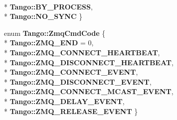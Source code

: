 \begin{DoxyCompactItemize}
\\*
{\bf Tango\-::\-B\-Y\-\_\-\-P\-R\-O\-C\-E\-S\-S}, 
\\*
{\bf Tango\-::\-N\-O\-\_\-\-S\-Y\-N\-C}
 \}
\item 
enum {\bf Tango\-::\-Zmq\-Cmd\-Code} \{ \\*
{\bf Tango\-::\-Z\-M\-Q\-\_\-\-E\-N\-D} = 0, 
\\*
{\bf Tango\-::\-Z\-M\-Q\-\_\-\-C\-O\-N\-N\-E\-C\-T\-\_\-\-H\-E\-A\-R\-T\-B\-E\-A\-T}, 
\\*
{\bf Tango\-::\-Z\-M\-Q\-\_\-\-D\-I\-S\-C\-O\-N\-N\-E\-C\-T\-\_\-\-H\-E\-A\-R\-T\-B\-E\-A\-T}, 
\\*
{\bf Tango\-::\-Z\-M\-Q\-\_\-\-C\-O\-N\-N\-E\-C\-T\-\_\-\-E\-V\-E\-N\-T}, 
\\*
{\bf Tango\-::\-Z\-M\-Q\-\_\-\-D\-I\-S\-C\-O\-N\-N\-E\-C\-T\-\_\-\-E\-V\-E\-N\-T}, 
\\*
{\bf Tango\-::\-Z\-M\-Q\-\_\-\-C\-O\-N\-N\-E\-C\-T\-\_\-\-M\-C\-A\-S\-T\-\_\-\-E\-V\-E\-N\-T}, 
\\*
{\bf Tango\-::\-Z\-M\-Q\-\_\-\-D\-E\-L\-A\-Y\-\_\-\-E\-V\-E\-N\-T}, 
\\*
{\bf Tango\-::\-Z\-M\-Q\-\_\-\-R\-E\-L\-E\-A\-S\-E\-\_\-\-E\-V\-E\-N\-T}
 \}
\end{DoxyCompactItemize}
